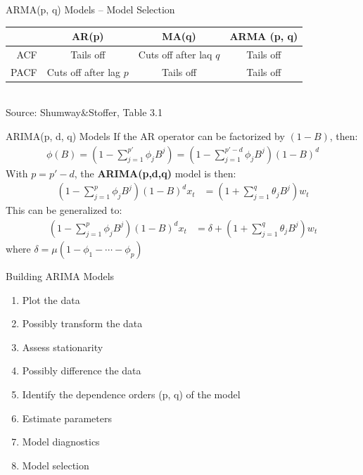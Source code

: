 \documentclass[ignorenonframetext,xcolor=x11names]{beamer}
\begin{document}
\begin{frame}{ARMA(p, q) Models -- Model Selection}
\small
\renewcommand{\arraystretch}{1.5}
\begin{tabular}{r|c|c|c} \hline
 & AR(p) & MA(q) & ARMA (p, q) \\ \hline
 ACF & Tails off & Cuts off after laq $q$ & Tails off \\
 PACF & Cuts off after lag $p$ & Tails off & Tails off \\ \hline
\end{tabular} \\

\vspace{\baselineskip}
\scriptsize Source: Shumway\&Stoffer, Table 3.1 \normalsize
\end{frame}


\begin{frame}{ARIMA(p, d, q) Models}
If the AR operator can be factorized by $(1-B)$, then:
\begin{align*}
\phi (B) = \left(1 - \sum_{j=1}^{p'} \phi_j B^j \right) = \left(1 - \sum_{j=1}^{p'-d} \phi_j B^j \right) (1 - B)^d 
\end{align*}
With $p=p'-d$, the \textbf{ARIMA(p,d,q)} model is then:
\begin{align*}
\left( 1 - \sum_{j=1}^p \phi_j B^j \right) (1-B)^d x_t &= \left( 1 + \sum_{j=1}^q \theta_j B^j \right) w_t
\end{align*}
This can be generalized to:
\begin{align*}
\left( 1 - \sum_{j=1}^p \phi_j B^j \right) (1-B)^d x_t &= \delta + \left( 1 + \sum_{j=1}^q \theta_j B^j \right) w_t
\end{align*} 
where $\delta = \mu(1 - \phi_1 - \cdots - \phi_p)$
\end{frame}


\begin{frame}{Building ARIMA Models}
\begin{enumerate}
  \item Plot the data
  \item Possibly transform the data
  \item Assess stationarity
  \item Possibly difference the data
  \item Identify the dependence orders (p, q) of the model
  \item Estimate parameters
  \item Model diagnostics
  \item Model selection
\end{enumerate}
\end{frame}
\end{document}
